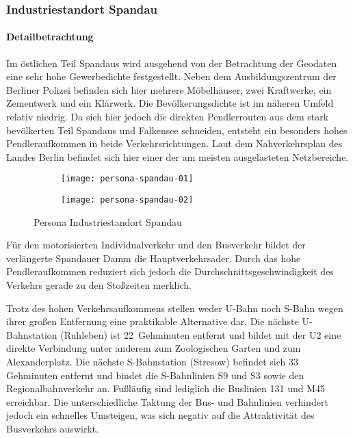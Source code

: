 \subsubsection{Industriestandort Spandau}

\paragraph{Detailbetrachtung}

Im östlichen Teil Spandaus wird ausgehend von der Betrachtung der Geodaten eine sehr hohe Gewerbedichte festgestellt. Neben dem Ausbildungszentrum der Berliner Polizei befinden sich hier mehrere Möbelhäuser, zwei Kraftwerke, ein Zementwerk und ein Klärwerk. Die Bevölkerungsdichte ist im näheren Umfeld relativ niedrig. Da sich hier jedoch die direkten Pendlerrouten aus dem stark bevölkerten Teil Spandaus und Falkensee schneiden, entsteht ein besonders hohes Pendleraufkommen in beide Verkehrsrichtungen. Laut dem Nahverkehrsplan des Landes Berlin befindet sich hier einer der am meisten ausgelasteten Netzbereiche.

\begin{figure}
    \centering
    \begin{subfigure}{.5\textwidth}
        \centering
        \texttt{[image: persona-spandau-01]}
    \end{subfigure}%
    \begin{subfigure}{.5\textwidth}
        \centering
        \texttt{[image: persona-spandau-02]}
    \end{subfigure}
    \caption{Persona Industriestandort Spandau}
    \label{persona-spandau}
\end{figure}

Für den motorisierten Individualverkehr und den Busverkehr bildet der verlängerte Spandauer Damm die Hauptverkehrsader. Durch das hohe Pendleraufkommen reduziert sich jedoch die Durchschnittsgeschwindigkeit des Verkehrs gerade zu den Stoßzeiten merklich.

Trotz des hohen Verkehrsaufkommens stellen weder U-Bahn noch S-Bahn wegen ihrer großen Entfernung eine praktikable Alternative dar. Die nächste U-Bahnstation (Ruhleben) ist 22~Gehminuten entfernt und bildet mit der U2 eine direkte Verbindung unter anderem zum Zoologischen Garten und zum Alexanderplatz. Die nächste S-Bahnstation (Stresow) befindet sich 33 Gehminuten entfernt und bindet die S-Bahnlinien S9 und S3 sowie den Regionalbahnverkehr an. Fußläufig sind lediglich die Buslinien 131 und M45 erreichbar. Die unterschiedliche Taktung der Bus- und Bahnlinien verhindert jedoch ein schnelles Umsteigen, was sich negativ auf die Attraktivität des Busverkehrs auswirkt.

